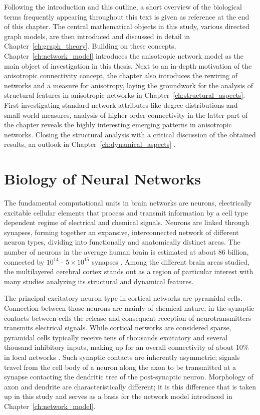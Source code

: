 Following the introduction and this outline, a short overview of the
biological terms frequently appearing throughout this text is given as
reference at the end of this chapter. The central mathematical objects
in this study, various directed graph models, are then introduced and
discussed in detail in Chapter~\ref{ch:graph_theory}. Building on
these concepts, Chapter~\ref{ch:network_model} introduces the
anisotropic network model as the main object of investigation in this
thesis. Next to an in-depth motivation of the anisotropic connectivity
concept, the chapter also introduces the rewiring of networks and a
measure for anisotropy, laying the groundwork for the analysis of
structural features in anisotropic networks in
Chapter~\ref{ch:structural_aspects}. First investigating standard
network attributes like degree distributions and small-world measures,
analysis of higher order connectivity in the latter part of the
chapter reveals the highly interesting emerging patterns in
anisotropic networks. Closing the structural analysis with a critical
discussion of the obtained results, an outlook in
Chapter~\ref{ch:dynamical_aspects} . 



\section{Biology of Neural Networks}\label{sec:Biology} 



The fundamental computational units in brain networks are
neurons, electrically excitable cellular elements that
process and transmit information by a cell type dependent regime of
electrical and chemical signals. Neurons are linked through
synapses, forming together an expansive, interconnected
network of different neuron types, dividing into functionally and
anatomically distinct areas. The number of neurons in the average
human brain is estimated at about 86 billion, connected by
$10^{14}$ - $5\times10^{15}$ synapses \parencite{Herculano2009,
  Drachman2005}. Among the different brain areas studied, the
multilayered cerebral cortex stands out as a region of
particular interest with many studies analyzing its structural and
dynamical features.

The principal excitatory neuron type in cortical
networks are pyramidal cells. Connection between those neurons are mainly of chemical
nature, in the synaptic contacts between cells the release and
consequent reception of neurotransmitters transmits electrical
signals. While cortical networks are considered sparse, pyramidal
cells typically receive tens of thousands excitatory and several
thousand inhibitory inputs, making up for an overall connectivity of
about $10\%$ in local networks \parencite{Spruston2009}. Such synaptic
contacts are inherently asymmetric; signals travel from the cell body
of a neuron along the axon to be transmitted at a synapse contacting
the dendritic tree of the post-synaptic neuron. Morphology of axon and
dendrite are characteristically different; it is this difference that
is taken up in this study and serves as a basis for the network model introduced in Chapter~\ref{ch:network_model}.

